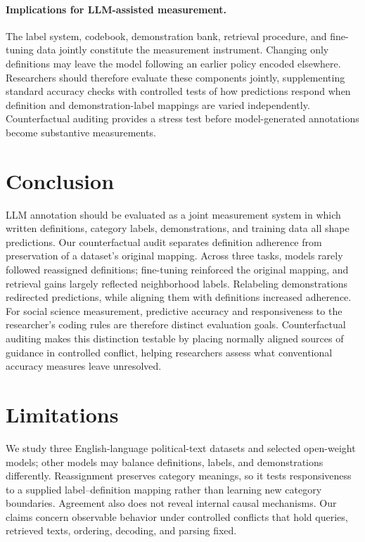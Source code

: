 \documentclass[11pt]{article}
\begin{document}
\paragraph{Implications for LLM-assisted measurement.}
The label system, codebook, demonstration bank, retrieval procedure, and fine-tuning data jointly constitute the measurement instrument. Changing only definitions may leave the model following an earlier policy encoded elsewhere. Researchers should therefore evaluate these components jointly, supplementing standard accuracy checks with controlled tests of how predictions respond when definition and demonstration-label mappings are varied independently. Counterfactual auditing provides a stress test before model-generated annotations become substantive measurements.


\section{Conclusion}

LLM annotation should be evaluated as a joint measurement system in which written definitions, category labels, demonstrations, and training data all shape predictions. Our counterfactual audit separates definition adherence from preservation of a dataset's original mapping. Across three tasks, models rarely followed reassigned definitions; fine-tuning reinforced the original mapping, and retrieval gains largely reflected neighborhood labels. Relabeling demonstrations redirected predictions, while aligning them with definitions increased adherence. For social science measurement, predictive accuracy and responsiveness to the researcher’s coding rules are therefore distinct evaluation goals. Counterfactual auditing makes this distinction testable by placing normally aligned sources of guidance in controlled conflict, helping researchers assess what conventional accuracy measures leave unresolved.

\section*{Limitations}

We study three English-language political-text datasets and selected open-weight models; other models may balance definitions, labels, and demonstrations differently. 
Reassignment preserves category meanings, so it tests responsiveness to a supplied label--definition mapping rather than learning new category boundaries. Agreement also does not reveal internal causal mechanisms. Our claims concern observable behavior under controlled conflicts that hold queries, retrieved texts, ordering, decoding, and parsing fixed. 
\end{document}
